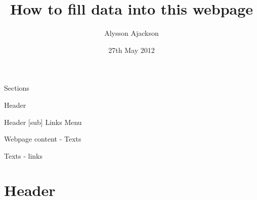 \documentclass{article}
\title{How to fill data into this webpage}
\author{Alysson Ajackson}
\date{27th May 2012}
\begin{document}
\maketitle

Sections
\begin{center}
\begin{list}{Section :~}{}
\item Header
\item Header [sub] Links Menu
\item Webpage content - Texts
\item Texts - links
\end{list}
\end{center}

\vspace{10pt}

\section {Header}
\end{document}
